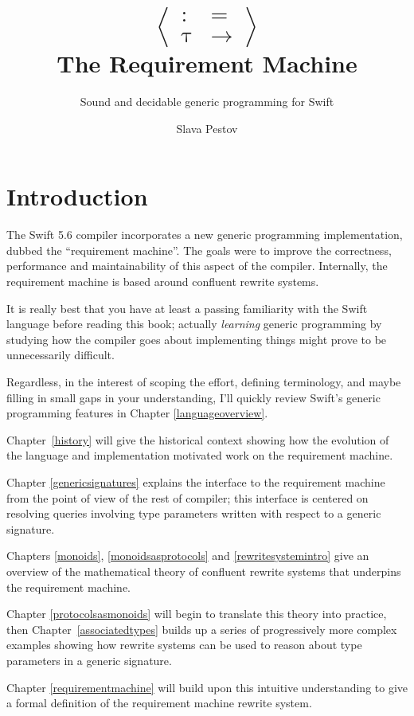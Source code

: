 \documentclass[headsepline,bibliography=totoc]{scrreport}
\title{\[
\left<
\begin{array}{cc}
:&=
\\
\uptau&\rightarrow
\end{array}
\right>
\]
The Requirement Machine}
\subtitle{Sound and decidable generic programming for Swift}
\author{Slava Pestov}
\date{}
\theoremstyle{definition}
\theoremstyle{definition}
\theoremstyle{definition}
\begin{document}
\maketitle

\tableofcontents

\chapter{Introduction}

The Swift 5.6 compiler incorporates a new generic programming implementation, dubbed the ``requirement machine''. The goals were to improve the correctness, performance and maintainability of this aspect of the compiler. Internally, the requirement machine is based around confluent rewrite systems.

It is really best that you have at least a passing familiarity with the Swift language before reading this book; actually \emph{learning} generic programming by studying how the compiler goes about implementing things might prove to be unnecessarily difficult.

Regardless, in the interest of scoping the effort, defining terminology, and maybe filling in small gaps in your understanding, I'll quickly review Swift's generic programming features in Chapter \ref{languageoverview}.

Chapter~\ref{history} will give the historical context showing how the evolution of the language and implementation motivated work on the requirement machine.

Chapter \ref{genericsignatures} explains the interface to the requirement machine from the point of view of the rest of compiler; this interface is centered on resolving queries involving type parameters written with respect to a generic signature.

Chapters \ref{monoids}, \ref{monoidsasprotocols} and \ref{rewritesystemintro} give an overview of the mathematical theory of confluent rewrite systems that underpins the requirement machine.

Chapter \ref{protocolsasmonoids} will begin to translate this theory into practice, then Chapter~\ref{associatedtypes} builds up a series of progressively more complex examples showing how rewrite systems can be used to reason about type parameters in a generic signature.

Chapter \ref{requirementmachine} will build upon this intuitive understanding to give a formal definition of the requirement machine rewrite system.
\end{document}
